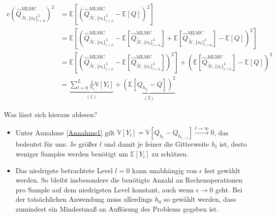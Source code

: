 \begin{align}
e(\widehat{Q}_{\tilde{\mathcal{H}},\{ n_l \}_{l=0}^L }^{\text{MLMC}})^2 &= \mathbb{E}  \left[ (\widehat{Q}_{\tilde{\mathcal{H}},\{ n_l \}_{l=0}^L }^{\text{MLMC}}- \mathbb{E}[Q])^2 \right] \nonumber \\
&= \mathbb{E}  \left[ (\widehat{Q}_{\tilde{\mathcal{H}},\{ n_l \}_{l=0}^L }^{\text{MLMC}} - \mathbb{E}[\widehat{Q}_{\tilde{\mathcal{H}},\{ n_l \}_{l=0}^L }^{\text{MLMC}}]+\mathbb{E}[\widehat{Q}_{\tilde{\mathcal{H}},\{ n_l \}_{l=0}^L }^{\text{MLMC}}]- \mathbb{E}[Q])^2 \right] \nonumber \\
&= \mathbb{E} \left[  (\widehat{Q}_{\tilde{\mathcal{H}},\{ n_l \}_{l=0}^L }^{\text{MLMC}}-\mathbb{E}[\widehat{Q}_{\tilde{\mathcal{H}},\{ n_l \}_{l=0}^L }^{\text{MLMC}}])^2 \right] +  \left(  \mathbb{E}[\widehat{Q}_{\tilde{\mathcal{H}},\{ n_l \}_{l=0}^L }^{\text{MLMC}}] - \mathbb{E}[Q] \right)^2 \nonumber \\
&= \underbrace{\sum_{l=0}^L \frac{1}{n_l} \mathbb{V}[Y_l]}_{(1)} + \underbrace{\left( \mathbb{E}[Q_{h_L}-Q] \right)^2}_{(2)}
\end{align}
\begin{Bemerkung}Was lässt sich hieraus ablesen?
	\begin{itemize}
		\item Unter Annahme \ref{Annahme1} gilt $ \mathbb{V}[Y_l] = \mathbb{V}[Q_{h_l}-Q_{h_{l-1}}] \stackrel{l \to \infty}{\to} 0  $, das bedeutet für uns: Je größer $ l $ und damit je feiner die Gitterweite $ h_l $ ist, desto weniger Samples werden benötigt um $ \mathbb{E}[Y_l] $ zu schätzen.
		\item Das niedrigste betrachtete Level $ l = 0 $ kann unabhängig von $ \epsilon $ fest gewählt werden. So bleibt insbesondere die benötigte Anzahl an Rechenoperationen pro Sample auf dem niedrigsten Level konstant, auch wenn $ \epsilon \to 0 $ geht. Bei der tatsächlichen Anwendung muss allerdings $ h_0 $ so gewählt werden, dass zumindest ein Mindestmaß an Auflösung des Problems gegeben ist.
	\end{itemize}
\end{Bemerkung} 
